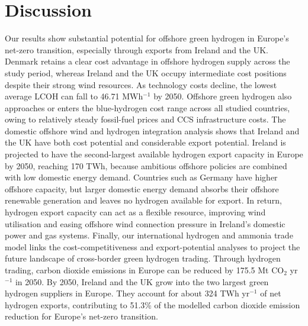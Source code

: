 \documentclass[pdflatex,lineno,sn-mathphys,Numbered]{sn-jnl}%
\begin{document}
\section{Discussion}
Our results show substantial potential for offshore green hydrogen in Europe's net-zero transition, especially through exports from Ireland and the UK.
Denmark retains a clear cost advantage in offshore hydrogen supply across the study period, whereas Ireland and the UK occupy intermediate cost positions despite their strong wind resources.
As technology costs decline, the lowest average LCOH can fall to 46.71 \texteuro{} MWh$^{-1}$ by 2050. Offshore green hydrogen also approaches or enters the blue-hydrogen cost range across all studied countries, owing to relatively steady fossil-fuel prices and CCS infrastructure costs.
The domestic offshore wind and hydrogen integration analysis shows that Ireland and the UK have both cost potential and considerable export potential. Ireland is projected to have the second-largest available hydrogen export capacity in Europe by 2050, reaching 170 TWh, because ambitious offshore policies are combined with low domestic energy demand. Countries such as Germany have higher offshore capacity, but larger domestic energy demand absorbs their offshore renewable generation and leaves no hydrogen available for export. In return, hydrogen export capacity can act as a flexible resource, improving wind utilisation and easing offshore wind connection pressure in Ireland's domestic power and gas systems.
Finally, our international hydrogen and ammonia trade model links the cost-competitiveness and export-potential analyses to project the future landscape of cross-border green hydrogen trading. Through hydrogen trading, carbon dioxide emissions in Europe can be reduced by 175.5 Mt CO$_2$ yr$^{-1}$ in 2050.
By 2050, Ireland and the UK grow into the two largest green hydrogen suppliers in Europe. They account for about 324 TWh yr$^{-1}$ of net hydrogen exports, contributing to 51.3\% of the modelled carbon dioxide emission reduction for Europe's net-zero transition.
\end{document}
